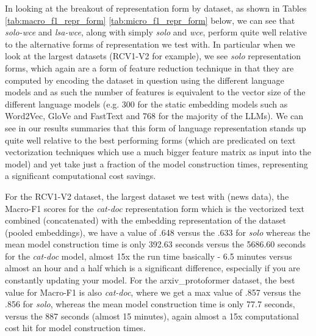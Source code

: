 \documentclass[final]{clv2025-revised}
\begin{document}
In looking at the breakout of representation form by dataset, as shown in Tables \ref{tab:macro_f1_repr_form} \ref{tab:micro_f1_repr_form} below, we can see that \textit{solo-wce} and \textit{lsa-wce}, along with simply \textit{solo} and \textit{wce}, perform quite well relative to the alternative forms of representation we test with. In particular when we look at the largest datasets (RCV1-V2 for example), we see \textit{solo} representation forms, which again are a form of feature reduction technique in that they are computed by encoding the dataset in question using the different language models and as such the number of features is equivalent to the vector size of the different language models (e.g. 300 for the static embedding models such as Word2Vec, GloVe and FastText and 768 for the majority of the LLMs). We can see in our results summaries that this form of language representation stands up quite well relative to the best performing forms (which are predicated on text vectorization techniques which use a much bigger feature matrix as input into the model) and yet take just a fraction of the model construction times, representing a significant computational cost savings.

For the RCV1-V2 dataset, the largest dataset we test with (news data), the Macro-F1 scores for the \textit{cat-doc} representation form which is the vectorized text combined (concatenated) with the embedding representation of the dataset (pooled embeddings), we have a value of .648 versus the .633 for \textit{solo} whereas the mean model construction time is only 392.63 seconds versus the 5686.60 seconds for the \textit{cat-doc} model, almost 15x the run time basically - 6.5 minutes versus almost an hour and a half which is a significant difference, especially if you are constantly updating your model. For the arxiv\_protoformer dataset, the best value for Macro-F1 is also \textit{cat-doc}, where we get a max value of .857 versus the .856 for \textit{solo}, whereas the mean model construction time is only 77.7 seconds, versus the 887 seconds (almost 15 minutes), again almost a 15x computational cost hit for model construction times.
\end{document}
